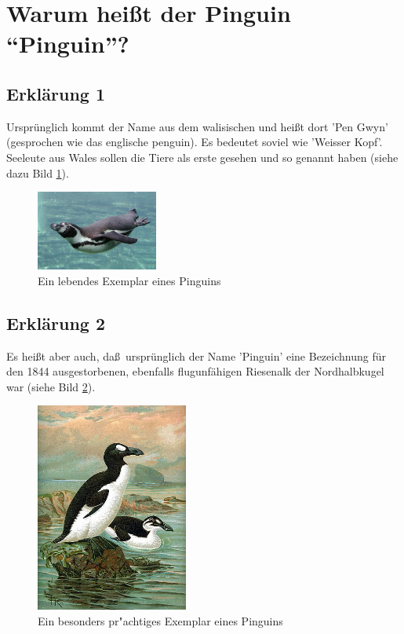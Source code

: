 \section{Warum heißt der Pinguin "`Pinguin"'?}
\subsection{Erklärung 1}
Ursprünglich kommt der Name aus dem walisischen und heißt dort 'Pen Gwyn' (gesprochen wie das englische penguin). Es bedeutet soviel wie 'Weisser Kopf'. Seeleute aus Wales sollen die Tiere als erste gesehen und so genannt haben (siehe dazu Bild \ref{img:pen}).

\begin{figure}[H]
\begin{center}
\includegraphics[width=4cm]{bilder/swim-Ping.jpg}
\caption{Ein lebendes Exemplar eines Pinguins}
\label{img:pen}
\end{center}
\end{figure}

\subsection{Erklärung 2}
Es heißt aber auch, da\ss \ ursprünglich der Name 'Pinguin' eine Bezeichnung für den 1844 ausgestorbenen, ebenfalls flugunfähigen Riesenalk der Nordhalbkugel war (siehe Bild \ref{img:auk}).

\begin{figure}[H]
\begin{center}
\includegraphics[width=5cm]{bilder/GreatAuk.jpg}
\caption{Ein besonders pr"achtiges Exemplar eines Pinguins}
\label{img:auk}
\end{center}
\end{figure}

